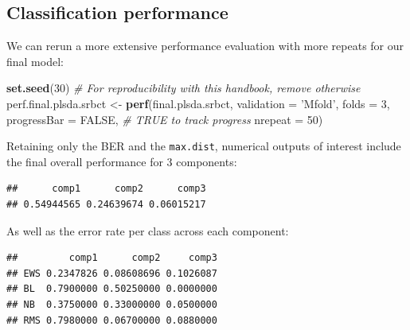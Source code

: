 \documentclass[]{book}
\newenvironment{Shaded}{\begin{snugshade}}{\end{snugshade}}
\newcommand{\CommentTok}[1]{\textcolor[rgb]{0.56,0.35,0.01}{\textit{#1}}}
\newcommand{\DataTypeTok}[1]{\textcolor[rgb]{0.13,0.29,0.53}{#1}}
\newcommand{\DecValTok}[1]{\textcolor[rgb]{0.00,0.00,0.81}{#1}}
\newcommand{\KeywordTok}[1]{\textcolor[rgb]{0.13,0.29,0.53}{\textbf{#1}}}
\newcommand{\NormalTok}[1]{#1}
\newcommand{\OperatorTok}[1]{\textcolor[rgb]{0.81,0.36,0.00}{\textbf{#1}}}
\newcommand{\OtherTok}[1]{\textcolor[rgb]{0.56,0.35,0.01}{#1}}
\newcommand{\StringTok}[1]{\textcolor[rgb]{0.31,0.60,0.02}{#1}}
\begin{document}
\hypertarget{plsda:perf}{%
\subsection{Classification performance}\label{plsda:perf}}

We can rerun a more extensive performance evaluation with more repeats for our final model:

\begin{Shaded}
\begin{Highlighting}[]
\KeywordTok{set.seed}\NormalTok{(}\DecValTok{30}\NormalTok{) }\CommentTok{# For reproducibility with this handbook, remove otherwise}
\NormalTok{perf.final.plsda.srbct <-}\StringTok{ }\KeywordTok{perf}\NormalTok{(final.plsda.srbct, }\DataTypeTok{validation =} \StringTok{'Mfold'}\NormalTok{, }
                               \DataTypeTok{folds =} \DecValTok{3}\NormalTok{, }
                               \DataTypeTok{progressBar =} \OtherTok{FALSE}\NormalTok{, }\CommentTok{# TRUE to track progress}
                               \DataTypeTok{nrepeat =} \DecValTok{50}\NormalTok{) }
\end{Highlighting}
\end{Shaded}

Retaining only the BER and the \texttt{max.dist}, numerical outputs of interest include the final overall performance for 3 components:

\begin{Shaded}
\end{Shaded}

\begin{verbatim}
##      comp1      comp2      comp3 
## 0.54944565 0.24639674 0.06015217
\end{verbatim}

As well as the error rate per class across each component:

\begin{Shaded}
\end{Shaded}

\begin{verbatim}
##         comp1      comp2     comp3
## EWS 0.2347826 0.08608696 0.1026087
## BL  0.7900000 0.50250000 0.0000000
## NB  0.3750000 0.33000000 0.0500000
## RMS 0.7980000 0.06700000 0.0880000
\end{verbatim}
\end{document}
